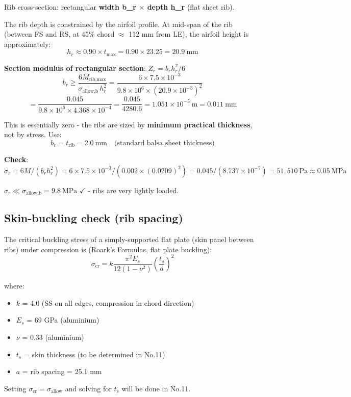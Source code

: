 \documentclass[10pt,a4paper]{article}
\begin{document}
Rib cross-section: rectangular \textbf{width b\_r ${\times}$ depth h\_r} (flat sheet rib).

The rib depth is constrained by the airfoil profile. At mid-span of the rib (between FS and RS, at 45\% chord ${\approx}$ 112 mm from LE), the airfoil height is approximately:
\[
h_r \approx 0.90 \times t_{\max} = 0.90 \times 23.25 = 20.9\ \text{mm}
\]

\textbf{Section modulus of rectangular section}: $Z_r = b_r h_r^2 / 6$
\[
b_r \geq \frac{6 M_{\text{rib,max}}}{\sigma_{\text{allow,b}}\, h_r^2} = \frac{6 \times 7.5 \times 10^{-3}}{9.8 \times 10^6 \times (20.9 \times 10^{-3})^2}
\]
\[
= \frac{0.045}{9.8 \times 10^6 \times 4.368 \times 10^{-4}} = \frac{0.045}{4280.6} = 1.051 \times 10^{-5}\ \text{m} = 0.011\ \text{mm}
\]

This is essentially zero - the ribs are sized by \textbf{minimum practical thickness}, not by stress. Use:
\[
b_r = t_{\text{rib}} = 2.0\ \text{mm} \quad \text{(standard balsa sheet thickness)}
\]

\textbf{Check}: $\sigma_r = 6 M / (b_r h_r^2) = 6 \times 7.5 \times 10^{-3} / (0.002 \times (0.0209)^2) = 0.045 / (8.737 \times 10^{-7}) = 51,510\ \text{Pa} \approx 0.05\ \text{MPa}$

$\sigma_r \ll \sigma_{\text{allow,b}} = 9.8\ \text{MPa}$ $\checkmark $ - ribs are very lightly loaded.

\subsection{Skin-buckling check (rib spacing)}

The critical buckling stress of a simply-supported flat plate (skin panel between ribs) under compression is (Roark's Formulas, flat plate buckling):
\[
\sigma_{\text{cr}} = k \frac{\pi^2 E_s}{12(1-\nu^2)} \left(\frac{t_s}{a}\right)^2
\]

where:
\begin{itemize}[noitemsep,topsep=2pt]
\item $k$ = 4.0 (SS on all edges, compression in chord direction)
\item $E_s$ = 69 GPa (aluminium)
\item $\nu$ = 0.33 (aluminium)
\item $t_s$ = skin thickness (to be determined in No.11)
\item $a$ = rib spacing = 25.1 mm
\end{itemize}

Setting $\sigma_{\text{cr}} = \sigma_{\text{allow}}$ and solving for $t_s$ will be done in No.11.
\end{document}
